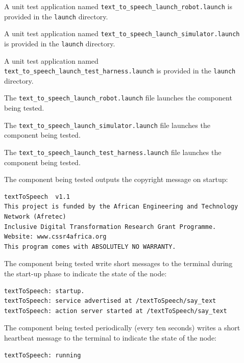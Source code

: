 \documentclass{CSSRforAfrica}
\newcommand{\checkboxChecked}{\fbox{\ding{51}}} %
\newcommand{\checkboxDashed}{\fbox{--}}         %
\begin{document}
\begin{description}

\item[\checkboxDashed] A unit test application named {\small \verb+text_to_speech_launch_robot.launch+} is provided in the {\small \verb+launch+} directory. 

\item[\checkboxDashed] A unit test application named {\small \verb+text_to_speech_launch_simulator.launch+} is provided in the {\small \verb+launch+} directory.

\item[\checkboxDashed] A unit test application named {\small \verb+text_to_speech_launch_test_harness.launch+} is provided in the {\small \verb+launch+} directory.

\item[\checkboxDashed] The {\small \verb+text_to_speech_launch_robot.launch+} file  launches the component being tested.

\item[\checkboxDashed] The {\small \verb+text_to_speech_launch_simulator.launch+} file  launches the component being tested.

\item[\checkboxDashed] The {\small \verb+text_to_speech_launch_test_harness.launch+} file  launches the component being tested.

\item[\checkboxChecked] The component being tested outputs the copyright message on startup:  \\ 
{\scriptsize
\begin{verbatim}
textToSpeech  v1.1
This project is funded by the African Engineering and Technology Network (Afretec)
Inclusive Digital Transformation Research Grant Programme.
Website: www.cssr4africa.org
This program comes with ABSOLUTELY NO WARRANTY.
\end{verbatim}
}

\item[\checkboxChecked] The component being tested write short messages to the terminal  during the start-up phase to indicate the state of the node:
{\small
\begin{verbatim}
textToSpeech: startup.
textToSpeech: service advertised at /textToSpeech/say_text
textToSpeech: action server started at /textToSpeech/say_text
\end{verbatim}
} 

\item[\checkboxChecked] The component being tested periodically (every ten seconds) writes a short heartbeat message to the terminal to indicate the state of the node:
{\small
\begin{verbatim}
textToSpeech: running
\end{verbatim}
}


\end{description}
\end{document}
